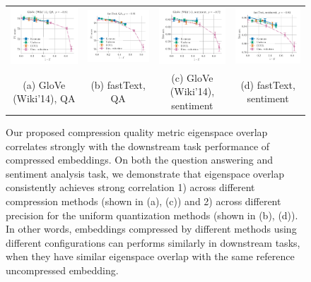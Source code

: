 \begin{figure}
	\footnotesize
	\begin{tabular}{@{\hskip -0.0in}c@{\hskip -0.0in}c@{\hskip -0.0in}c@{\hskip -0.0in}c@{\hskip -0.0in}}
		\includegraphics[width=.245\linewidth]{figures/glove400k_qa_best-f1_vs_subspace-dist-normalized_linx_det.pdf} &
		\includegraphics[width=.245\linewidth]{figures/fasttext1m_qa_best-f1_vs_subspace-dist-normalized_linx_det.pdf} &
		\includegraphics[width=.245\linewidth]{figures/glove400k_sentiment_sst_test-acc_vs_subspace-dist-normalized_linx_det.pdf} &
		\includegraphics[width=.245\linewidth]{figures/fasttext1m_sentiment_sst_test-acc_vs_subspace-dist-normalized_linx_det.pdf}	\\
		(a) GloVe (Wiki'14), QA & \;\;\;\;(b) fastText, QA  & \;\;\;\;\;\;(c) GloVe (Wiki'14), sentiment & \;\;\;\;\;(d) fastText, sentiment 
	\end{tabular}
	\caption{Our proposed compression quality metric eigenspace overlap correlates strongly with the downstream task performance of compressed embeddings.  On both the question answering and sentiment analysis task, we demonstrate that eigenspace overlap consistently achieves strong correlation 1) across different compression methods (shown in (a), (c)) and 2) across different precision for the uniform quantization methods (shown in (b), (d)). In other words, embeddings compressed by different methods using different configurations can performs similarly in downstream tasks, when they have similar eigenspace overlap with the same reference uncompressed embedding.}
	\label{fig:good_correlation_det}
\end{figure}


